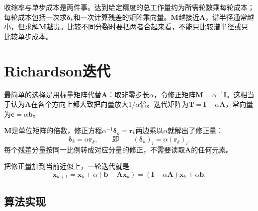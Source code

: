 收缩率与单步成本是两件事。达到给定精度的总工作量约为所需轮数乘每轮成本；每轮成本包括一次求$\bm\delta_k$和一次计算残差的矩阵乘向量。$\bm M$越接近$\bm A$，谱半径通常越小，但求解$\bm M$越贵。比较不同分裂时要把两者合起来看，不能只比较谱半径或只比较单步成本。

\section{Richardson迭代}
\label{sec:ls-richardson}

最简单的选择是用标量矩阵代替$\bm A$：取非零步长$\alpha$，令修正矩阵$\bm M=\alpha^{-1}\bm I$。这相当于认为$\bm A$在各个方向上都大致把向量放大$1/\alpha$倍。迭代矩阵为$\bm T=\bm I-\alpha\bm A$，常向量为$\bm c=\alpha\bm b$。

$\bm M$是单位矩阵的倍数，修正方程$\alpha^{-1}\bm\delta_k=\bm r_k$两边乘以$\alpha$就解出了修正量：
\begin{equation}
 \bm\delta_k=\alpha\bm r_k ,\qquad\text{即}\qquad (\bm\delta_k)_i=\alpha(\bm r_k)_i .
 \label{eq:ls-richardson-correction}
\end{equation}
每个残差分量按同一比例转成对应分量的修正，不需要读取$\bm A$的任何元素。

把修正量加到当前近似上，一轮迭代就是
\begin{equation}
 \bm x_{k+1}=\bm x_k+\alpha(\bm b-\bm A\bm x_k)=(\bm I-\alpha\bm A)\bm x_k+\alpha\bm b .
 \label{eq:ls-richardson-update}
\end{equation}

\subsection{算法实现}

